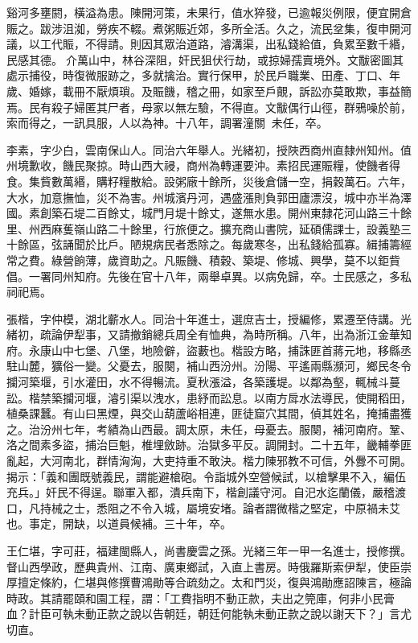 \begin{pinyinscope}
谿河多壅閼，橫溢為患。陳開河策，未果行，值水猝發，已逾報災例限，便宜開倉賑之。跋涉沮洳，勞疾不輟。煮粥賑近郊，多所全活。久之，流民坌集，復申開河議，以工代賑，不得請。則因其眾治道路，濬溝渠，出私錢給值，負累至數千緡，民感其德。介萬山中，林谷深阻，奸民狙伏行劫，或掠婦孺賣境外。文黻密圖其處示捕役，時復微服跡之，多就擒治。實行保甲，於民戶職業、田產、丁口、年歲、婚嫁，載冊不厭煩瑣。及賑饑，稽之冊，如家至戶覿，訴訟亦莫敢欺，事益簡焉。民有殺子婦匿其尸者，母家以無左驗，不得直。文黻偶行山徑，群鴉噪於前，索而得之，一訊具服，人以為神。十八年，調署潼關，未任，卒。

李素，字少白，雲南保山人。同治六年舉人。光緒初，授陜西商州直隸州知州。值州境歉收，饑民聚掠。時山西大祲，商州為轉運要沖。素招民運賑糧，使饑者得食。集貲數萬緡，購籽糧散給。設粥廠十餘所，災後倉儲一空，捐穀萬石。六年，大水，加意撫恤，災不為害。州城濱丹河，遇盛漲則負郭田廬漂沒，城中亦半為澤國。素創築石堤二百餘丈，城門月堤十餘丈，遂無水患。開州東隸花河山路三十餘里、州西麻蒦嶺山路二十餘里，行旅便之。擴充商山書院，延碩儒課士，設義塾三十餘區，弦誦聞於比戶。陋規病民者悉除之。每歲寒冬，出私錢給孤寡。緝捕籌經常之費。綠營餉薄，歲資助之。凡賑饑、積穀、築堤、修城、興學，莫不以鉅貲倡。一署同州知府。先後在官十八年，兩舉卓異。以病免歸，卒。士民感之，多私祠祀焉。

張楷，字仲模，湖北蘄水人。同治十年進士，選庶吉士，授編修，累遷至侍講。光緒初，疏論伊犁事，又請撤銷總兵周全有恤典，為時所稱。八年，出為浙江金華知府。永康山中七堡、八堡，地險僻，盜藪也。楷設方略，捕誅匪首蔣元地，移縣丞駐山麓，獷俗一變。父憂去，服闋，補山西汾州。汾陽、平遙兩縣瀕河，鄉民冬令攔河築堰，引水灌田，水不得暢流。夏秋漲溢，各築護堤。以鄰為壑，輒械斗蔓訟。楷禁築攔河堰，濬引渠以洩水，患紓而訟息。以南方戽水法導民，使開稻田，植桑課蠶。有山曰黑煙，與交山葫蘆峪相連，匪徒窟穴其間，偵其姓名，掩捕盡獲之。治汾州七年，考績為山西最。調太原，未任，母憂去。服闋，補河南府。鞏、洛之間素多盜，捕治巨魁，椎埋斂跡。治獄多平反。調開封。二十五年，畿輔拳匪亂起，大河南北，群情洶洶，大吏持重不敢決。楷力陳邪教不可信，外釁不可開。揭示：「義和團既號義民，謂能避槍砲。令詣城外空營候試，以槍擊果不入，編伍充兵。」奸民不得逞。聯軍入都，潰兵南下，楷創議守河。自汜水迄蘭儀，嚴稽渡口，凡持械之士，悉阻之不令入城，屬境安堵。論者謂微楷之堅定，中原禍未艾也。事定，開缺，以道員候補。三十年，卒。

王仁堪，字可莊，福建閩縣人，尚書慶雲之孫。光緒三年一甲一名進士，授修撰。督山西學政，歷典貴州、江南、廣東鄉試，入直上書房。時俄羅斯索伊犁，使臣崇厚擅定條約，仁堪與修撰曹鴻勛等合疏劾之。太和門災，復與鴻勛應詔陳言，極論時政。其請罷頤和園工程，謂：「工費指明不動正款，夫出之筦庫，何非小民膏血？計臣可執未動正款之說以告朝廷，朝廷何能執未動正款之說以謝天下？」言尤切直。


\end{pinyinscope}
